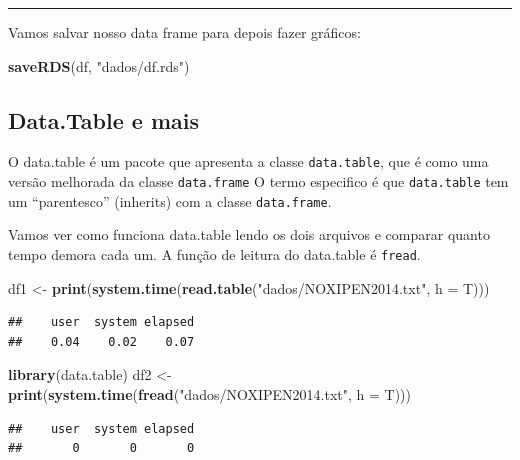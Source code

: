 \documentclass[]{book}
\newenvironment{Shaded}{\begin{snugshade}}{\end{snugshade}}
\newcommand{\KeywordTok}[1]{\textcolor[rgb]{0.13,0.29,0.53}{\textbf{#1}}}
\newcommand{\DataTypeTok}[1]{\textcolor[rgb]{0.13,0.29,0.53}{#1}}
\newcommand{\StringTok}[1]{\textcolor[rgb]{0.31,0.60,0.02}{#1}}
\newcommand{\NormalTok}[1]{#1}
\theoremstyle{definition}
\theoremstyle{definition}
\theoremstyle{definition}
\theoremstyle{remark}
\begin{document}
\begin{center}\rule{0.5\linewidth}{\linethickness}\end{center}

Vamos salvar nosso data frame para depois fazer gráficos:

\begin{Shaded}
\begin{Highlighting}[]
\KeywordTok{saveRDS}\NormalTok{(df, }\StringTok{"dados/df.rds"}\NormalTok{)}
\end{Highlighting}
\end{Shaded}

\subsection{Data.Table e mais}\label{data.table-e-mais}

O data.table é um pacote que apresenta a classe \texttt{data.table}, que
é como uma versão melhorada da classe \texttt{data.frame} O termo
especifico é que \texttt{data.table} tem um ``parentesco'' (inherits)
com a classe \texttt{data.frame}.

Vamos ver como funciona data.table lendo os dois arquivos e comparar
quanto tempo demora cada um. A função de leitura do data.table é
\texttt{fread}.

\begin{Shaded}
\begin{Highlighting}[]
\NormalTok{df1 <-}\StringTok{ }\KeywordTok{print}\NormalTok{(}\KeywordTok{system.time}\NormalTok{(}\KeywordTok{read.table}\NormalTok{(}\StringTok{"dados/NOXIPEN2014.txt"}\NormalTok{, }\DataTypeTok{h =}\NormalTok{ T)))}
\end{Highlighting}
\end{Shaded}

\begin{verbatim}
##    user  system elapsed 
##    0.04    0.02    0.07
\end{verbatim}

\begin{Shaded}
\begin{Highlighting}[]
\KeywordTok{library}\NormalTok{(data.table)}
\NormalTok{df2 <-}\StringTok{ }\KeywordTok{print}\NormalTok{(}\KeywordTok{system.time}\NormalTok{(}\KeywordTok{fread}\NormalTok{(}\StringTok{"dados/NOXIPEN2014.txt"}\NormalTok{, }\DataTypeTok{h =}\NormalTok{ T)))}
\end{Highlighting}
\end{Shaded}

\begin{verbatim}
##    user  system elapsed 
##       0       0       0
\end{verbatim}
\end{document}
